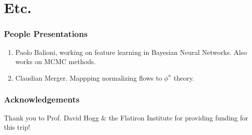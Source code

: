 \documentclass[12pt,fleqn]{article}
\numberwithin{equation}{section} %
\begin{document}
\part{Etc.}

\section{People Presentations} 
\begin{enumerate}
	\item Paolo Balioni, working on feature learning in Bayesian Neural Networks. Also works on MCMC methods.
	\item Claudian Merger. Mappping normalizing flows to $\phi^n$ theory.
\end{enumerate}

\section{Acknowledgements}
Thank you to Prof. David Hogg \& the Flatiron Institute for providing funding for this trip!
\end{document}
